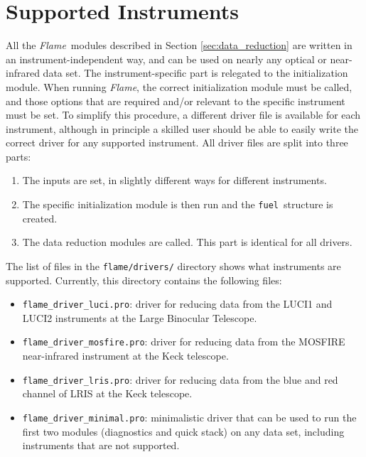 \documentclass[a4paper]{article}
\newcommand{\flame}{\emph{Flame}}
\newcommand{\fuel}{\texttt{fuel}}
\begin{document}
\begin{sloppypar}

\section{Supported Instruments}
\label{sec:instruments}

All the \flame\ modules described in Section \ref{sec:data_reduction} are written in an instrument-independent way, and can be used on nearly any optical or near-infrared data set. The instrument-specific part is relegated to the initialization module. When running \flame, the correct initialization module must be called, and those options that are required and/or relevant to the specific instrument must be set. To simplify this procedure, a different driver file is available for each instrument, although in principle a skilled user should be able to easily write the correct driver for any supported instrument. All driver files are split into three parts:
\begin{enumerate}
  \item The inputs are set, in slightly different ways for different instruments.
  \item The specific initialization module is then run and the \fuel\ structure is created.
  \item The data reduction modules are called. This part is identical for all drivers.
\end{enumerate}

The list of files in the \texttt{flame/drivers/} directory shows what instruments are supported. Currently, this directory contains the following files:
\begin{itemize}
  \item[] \texttt{flame\_driver\_luci.pro}: driver for reducing data from the LUCI1 and LUCI2 instruments at the Large Binocular Telescope.
  \item[] \texttt{flame\_driver\_mosfire.pro}: driver for reducing data from the MOSFIRE near-infrared instrument at the Keck telescope.
  \item[] \texttt{flame\_driver\_lris.pro}: driver for reducing data from the blue and red channel of LRIS at the Keck telescope.
  \item[] \texttt{flame\_driver\_minimal.pro}: minimalistic driver that can be used to run the first two modules (diagnostics and quick stack) on any data set, including instruments that are not supported.
\end{itemize}


\end{sloppypar}
\end{document}
